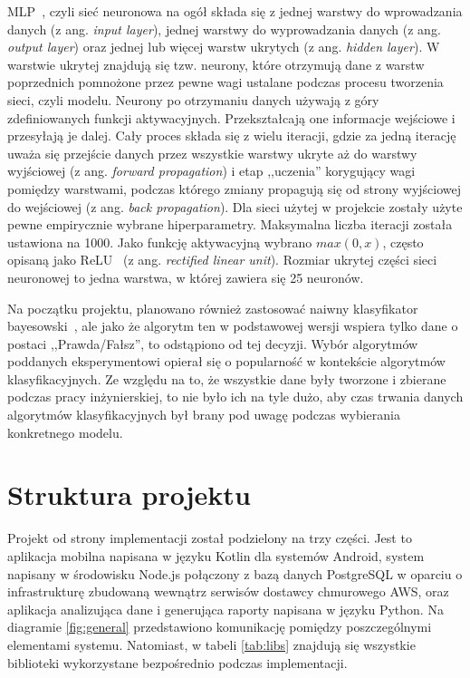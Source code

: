 \documentclass[a4paper,twoside,12pt]{book}
\newcommand{\obcy}[1]{\emph{#1}}
\newcommand{\ang}[1]{{\selectlanguage{british}\obcy{#1}}}
\begin{document}
MLP~\cite{mlp}, czyli sieć neuronowa na ogół składa się z jednej warstwy do wprowadzania danych (z ang. \ang{input layer}), jednej warstwy do wyprowadzania danych (z ang. \ang{output layer}) oraz jednej lub więcej warstw ukrytych (z ang. \ang{hidden layer}). W warstwie ukrytej znajdują się tzw. neurony, które otrzymują dane z warstw poprzednich pomnożone przez pewne wagi ustalane podczas procesu tworzenia sieci, czyli modelu. Neurony po otrzymaniu danych używają z góry zdefiniowanych funkcji aktywacyjnych. Przekształcają one informacje wejściowe i przesyłają je dalej. Cały proces składa się z wielu iteracji, gdzie za jedną iterację uważa się przejście danych przez wszystkie warstwy ukryte aż do warstwy wyjściowej (z ang. \ang{forward propagation}) i etap ,,uczenia''  korygujący wagi pomiędzy warstwami, podczas którego zmiany propagują się od strony wyjściowej do wejściowej (z ang. \ang{back propagation}). Dla sieci użytej w projekcie zostały użyte pewne empirycznie wybrane hiperparametry. Maksymalna liczba iteracji została ustawiona na 1000. Jako funkcję aktywacyjną wybrano $max(0, x)$, często opisaną jako ReLU~\cite{reludeep} (z ang. \ang{rectified linear unit}).
Rozmiar ukrytej części sieci neuronowej to jedna warstwa, w której zawiera się 25 neuronów.

Na początku projektu, planowano również zastosować naiwny klasyfikator bayesowski~\cite{bayes}, ale jako że algorytm ten w podstawowej wersji wspiera tylko dane o postaci ,,Prawda/Fałsz'', to odstąpiono od tej decyzji. Wybór algorytmów poddanych eksperymentowi opierał się o popularność w kontekście algorytmów klasyfikacyjnych. Ze względu na to, że wszystkie dane były tworzone i zbierane podczas pracy inżynierskiej, to nie było ich na tyle dużo, aby czas trwania danych algorytmów klasyfikacyjnych był brany pod uwagę podczas wybierania konkretnego modelu. 

\section{Struktura projektu}
\label{structure}
Projekt od strony implementacji został podzielony na trzy części. Jest to aplikacja mobilna napisana w języku Kotlin dla systemów Android, system napisany w środowisku Node.js połączony z bazą danych PostgreSQL w oparciu o infrastrukturę zbudowaną wewnątrz serwisów dostawcy chmurowego AWS, oraz aplikacja analizująca dane i generująca raporty napisana w języku Python. Na diagramie \ref{fig:general} przedstawiono komunikację pomiędzy poszczególnymi elementami systemu. Natomiast, w tabeli \ref{tab:libs} znajdują się wszystkie biblioteki wykorzystane bezpośrednio podczas implementacji.  
\end{document}
